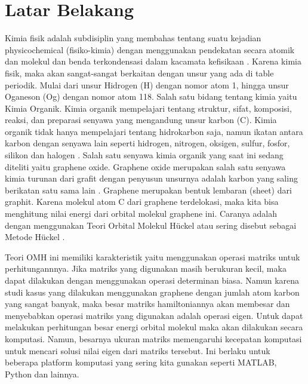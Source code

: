 \documentclass[12pt,a4paper]{report}
\begin{document}
\renewcommand{\thesection}{\arabic{chapter}.\arabic{section}}
\renewcommand{\thefigure}{\arabic{chapter}.\arabic{figure}}
\renewcommand{\thetable}{\arabic{chapter}.\arabic{table}}
\renewcommand{\theequation}{\arabic{chapter}.\arabic{equation}}
	\section{Latar Belakang}
	Kimia fisik adalah subdisiplin yang membahas tentang suatu kejadian physicochemical (fisiko-kimia) dengan menggunakan pendekatan secara atomik dan molekul dan benda terkondensasi dalam kacamata kefisikaan \cite{Slater1939}. Karena kimia fisik, maka akan sangat-sangat berkaitan dengan unsur yang ada di table periodik. Mulai dari unsur Hidrogen (H) dengan nomor atom 1, hingga unsur Oganeson (Og) dengan nomor atom 118. Salah satu bidang tentang kimia yaitu Kimia Organik. Kimia organik mempelajari tentang struktur, sifat, komposisi, reaksi, dan preparasi senyawa yang mengandung unsur karbon (C). Kimia organik tidak hanya mempelajari tentang hidrokarbon saja, namun ikatan antara karbon dengan senyawa lain seperti hidrogen, nitrogen, oksigen, sulfur, fosfor, silikon dan halogen \cite{ACS2020}. Salah satu senyawa kimia organik yang saat ini sedang diteliti yaitu graphene oxide. Graphene oxide merupakan salah satu senyawa kimia turunan dari grafit dengan penyusun unsurnya adalah karbon yang saling berikatan satu sama lain \cite{Zhen2017}. Graphene merupakan bentuk lembaran (sheet) dari graphit. Karena molekul atom C dari graphene terdelokasi, maka kita bisa menghitung nilai energi dari orbital molekul graphene ini. Caranya adalah dengan menggunakan Teori Orbital Molekul Hückel atau sering disebut sebagai Metode Hückel \cite{Ribeiro}.  
	
	Teori OMH ini memiliki karakteristik yaitu menggunakan operasi matriks untuk perhitungannnya. Jika matriks yang digunakan masih berukuran kecil, maka dapat dilakukan dengan menggunakan operasi determinan biasa. Namun karena studi kasus yang dilakukan menggunakan graphene dengan jumlah atom karbon yang sangat banyak, maka besar matriks hamiltoniannya akan membesar dan menyebabkan operasi matriks yang digunakan adalah operasi eigen. Untuk dapat melakukan perhitungan besar energi orbital molekul maka akan dilakukan secara komputasi. Namun, besarnya ukuran matriks memengaruhi kecepatan komputasi untuk mencari solusi nilai eigen dari matriks tersebut. Ini berlaku untuk beberapa platform komputasi yang sering kita gunakan seperti MATLAB, Python dan lainnya.  
	
\end{document}
